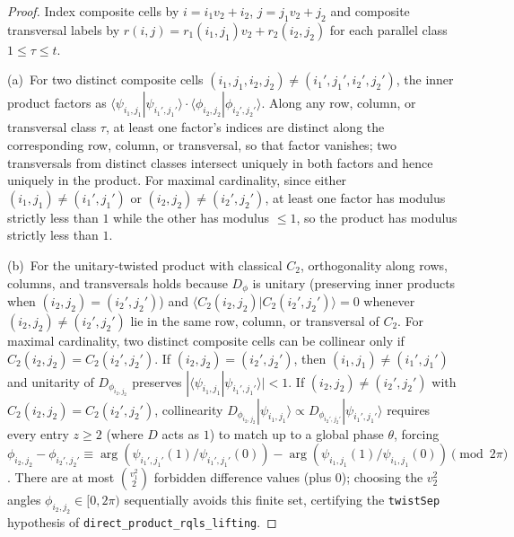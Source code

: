 \documentclass[11pt,reqno]{amsart}
\theoremstyle{definition}
\newcommand{\lid}[1]{{\footnotesize\nolinkurl{#1}}}
\begin{document}
\begin{proof}
Index composite cells by $i = i_1 v_2 + i_2$, $j = j_1 v_2 + j_2$ and composite
transversal labels by $r(i, j) = r_1(i_1, j_1) v_2 + r_2(i_2, j_2)$ for each parallel
class $1 \le \tau \le t$.

(a)~For two distinct composite cells $(i_1, j_1, i_2, j_2) \ne (i_1', j_1', i_2', j_2')$,
the inner product factors as $\langle \psi_{i_1,j_1} | \psi_{i_1',j_1'} \rangle \cdot
\langle \phi_{i_2,j_2} | \phi_{i_2',j_2'} \rangle$. Along any row, column, or
transversal class $\tau$, at least one factor's indices are distinct along the
corresponding row, column, or transversal, so that factor vanishes; two transversals from
distinct classes intersect uniquely in both factors and hence uniquely in the product.
For maximal cardinality, since either $(i_1,j_1) \ne (i_1',j_1')$ or
$(i_2,j_2) \ne (i_2',j_2')$, at least one factor has modulus strictly less than $1$ while
the other has modulus $\le 1$, so the product has modulus strictly less than $1$.

(b)~For the unitary-twisted product with classical $C_2$, orthogonality along rows,
columns, and transversals holds because $D_\phi$ is unitary (preserving inner products
when $(i_2, j_2) = (i_2', j_2')$) and $\langle C_2(i_2,j_2) | C_2(i_2',j_2') \rangle = 0$
whenever $(i_2,j_2) \ne (i_2',j_2')$ lie in the same row, column, or transversal of $C_2$.
For maximal cardinality, two distinct composite cells can be collinear only if
$C_2(i_2,j_2) = C_2(i_2',j_2')$. If $(i_2,j_2) = (i_2',j_2')$, then $(i_1,j_1) \ne
(i_1',j_1')$ and unitarity of $D_{\phi_{i_2,j_2}}$ preserves $|\langle \psi_{i_1,j_1} |
\psi_{i_1',j_1'} \rangle| < 1$. If $(i_2,j_2) \ne (i_2',j_2')$ with $C_2(i_2,j_2) =
C_2(i_2',j_2')$, collinearity $D_{\phi_{i_2,j_2}}|\psi_{i_1,j_1}\rangle \propto
D_{\phi_{i_2',j_2'}}|\psi_{i_1',j_1'}\rangle$ requires every entry $z \ge 2$ (where $D$
acts as $1$) to match up to a global phase $\theta$, forcing $\phi_{i_2,j_2} -
\phi_{i_2',j_2'} \equiv \arg(\psi_{i_1',j_1'}(1)/\psi_{i_1',j_1'}(0)) -
\arg(\psi_{i_1,j_1}(1)/\psi_{i_1,j_1}(0)) \pmod{2\pi}$. There are at most
$\binom{v_1^2}{2}$ forbidden difference values (plus $0$); choosing the $v_2^2$ angles
$\phi_{i_2,j_2} \in [0, 2\pi)$ sequentially avoids this finite set, certifying the
\lid{twistSep} hypothesis of \lid{direct_product_rqls_lifting}.
\end{proof}
\end{document}
